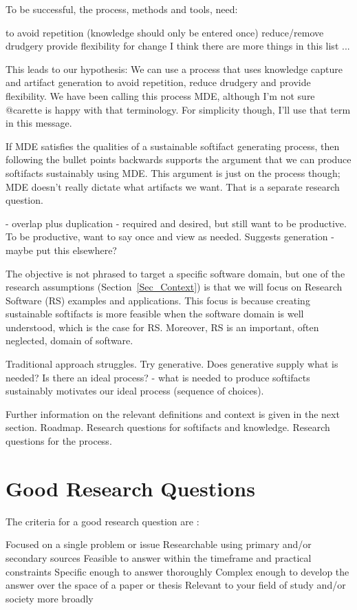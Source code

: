 \documentclass[12pt]{article}
\begin{document}
To be successful, the process, methods and tools, need:

to avoid repetition (knowledge should only be entered once)
reduce/remove drudgery
provide flexibility for change
I think there are more things in this list ...


This leads to our hypothesis: We can use a process that uses knowledge capture
and artifact generation to avoid repetition, reduce drudgery and provide
flexibility.  We have been calling this process MDE, although I'm not sure
@carette is happy with that terminology.  For simplicity though, I'll use that
term in this message.

If MDE satisfies the qualities of a sustainable softifact generating process,
then following the bullet points backwards supports the argument that we can
produce softifacts sustainably using MDE.  This argument is just on the process
though; MDE doesn't really dictate what artifacts we want.  That is a separate
research question.

- overlap
plus duplication - required and desired, but still want to be productive.  To be
productive, want to say once and view as needed.  Suggests generation - maybe
put this elsewhere?

The objective is not phrased to target a specific software domain, but one of
the research assumptions (Section~\ref{Sec_Context}) is that we will focus on
Research Software (RS) examples and applications.  This focus is because
creating sustainable softifacts is more feasible when the software domain is
well understood, which is the case for RS.  Moreover, RS is an important,
often neglected, domain of software.

Traditional approach struggles.  Try generative.  Does generative supply what is
needed?  Is there an ideal process?  - what is needed to produce softifacts
sustainably motivates our ideal process (sequence of choices).

Further information on the relevant definitions and context is given in the next
section.  Roadmap.  Research questions for softifacts and knowledge.  Research
questions for the process.

\section{Good Research Questions}

The criteria for a good research question are :

Focused on a single problem or issue
Researchable using primary and/or secondary sources
Feasible to answer within the timeframe and practical constraints
Specific enough to answer thoroughly
Complex enough to develop the answer over the space of a paper or thesis
Relevant to your field of study and/or society more broadly
\end{document}
